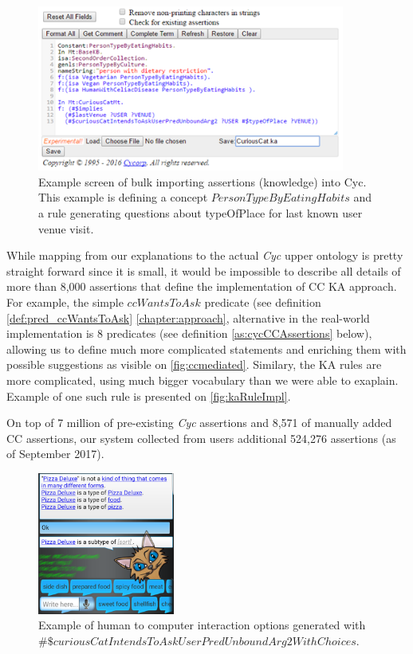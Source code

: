 \begin{figure}[H]
	\centering
		\includegraphics[width=0.9\textwidth]{figures/keEntry.png}
	\caption{Example screen of bulk importing assertions (knowledge) into Cyc.
This example is defining a concept $PersonTypeByEatingHabits$ and a rule 
generating questions about typeOfPlace for last known user venue visit.}
	\label{fig:ketext}
\end{figure}

While mapping from our explanations to the actual \emph{Cyc} upper ontology is 
pretty straight forward since it is small, it would be impossible to describe
all details of more than 8,000 assertions that define the implementation of
CC KA approach. For example, the simple $ccWantsToAsk$ predicate (see
definition \ref{def:pred_ccWantsToAsk} \autoref{chapter:approach}, alternative 
in the real-world implementation
is 8 predicates (see definition \ref{as:cycCCAssertions} below), allowing us to
define much more complicated statements and
enriching them with possible suggestions as visible on \autoref{fig:ccmediated}.
Similary, the KA rules are more complicated, using much bigger vocabulary
than we were able to exaplain. Example of one such rule is presented on
\autoref{fig:kaRuleImpl}.

On top of 7 million of pre-existing \emph{Cyc} assertions and 8,571 of manually
added CC assertions, our system collected from users additional 524,276 
assertions (as of September 2017).

\begin{figure}[h]
	\centering
		\includegraphics[width=0.4\textwidth]{figures/androidMediated.png}
	\caption{Example of human to computer interaction options generated with
$\#\$curiousCatIntendsToAskUserPredUnboundArg2WithChoices$.}
	\label{fig:ccmediated}
\end{figure}

